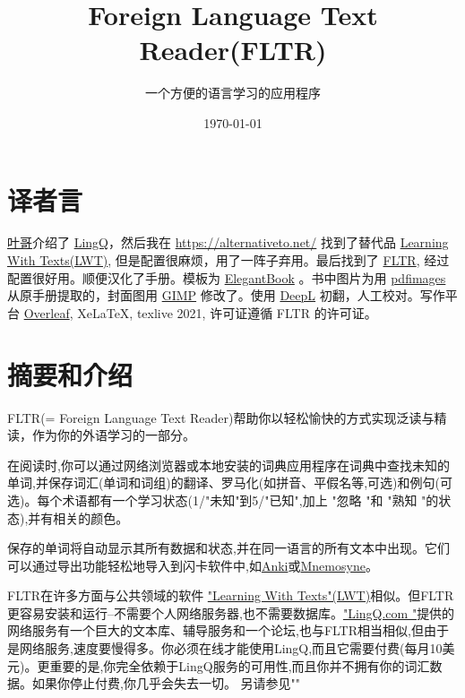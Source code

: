 \documentclass[cn,10pt,math=newtx,citestyle=gb7714-2015,bibstyle=gb7714-2015]{elegantbook}
\title{Foreign Language Text Reader(FLTR)}
\subtitle{一个方便的语言学习的应用程序}
\date{\today{}}
\begin{document}
\maketitle
\frontmatter

\tableofcontents

\mainmatter
\setlength{\parskip}{2em}

\chapter*{译者言}

\href{https://www.zhihu.com/people/L.M.Sherlock}{叶哥}介绍了 \href{http://www.lingq.com/}{LingQ}，然后我在 \url{https://alternativeto.net/} 找到了替代品  \href{http://lwt.sourceforge.net/}{Learning With Texts(LWT)}, 但是配置很麻烦，用了一阵子弃用。最后找到了 \href{https://sourceforge.net/projects/foreign-language-text-reader/}{FLTR}, 经过配置很好用。顺便汉化了手册。模板为 \href{https://github.com/ElegantLaTeX/ElegantBook}{ElegantBook} 。书中图片为用 \href{https://man.archlinux.org/man/pdfimages.1.en}{pdfimages} 从原手册提取的，封面图用 \href{https://www.gimp.org/}{GIMP} 修改了。使用 \href{https://www.deepl.com/translator/files}{DeepL} 初翻，人工校对。写作平台 \href{https://www.overleaf.com/}{Overleaf}, XeLaTeX, texlive 2021, 许可证遵循 FLTR 的许可证。

\chapter{摘要和介绍}

FLTR(= Foreign Language Text Reader)帮助你以轻松愉快的方式实现泛读与精读，作为你的外语学习的一部分。


在阅读时,你可以通过网络浏览器或本地安装的词典应用程序在词典中查找未知的单词,并保存词汇(单词和词组)的翻译、罗马化(如拼音、平假名等,可选)和例句(可选)。每个术语都有一个学习状态(1/"未知"到5/"已知",加上 "忽略 "和 "熟知 "的状态),并有相关的颜色。

保存的单词将自动显示其所有数据和状态,并在同一语言的所有文本中出现。它们可以通过导出功能轻松地导入到闪卡软件中,如\href{http://ankisrs.net/}{Anki}或\href{http://www.mnemosyne-proj.org/}{Mnemosyne}。


FLTR在许多方面与公共领域的软件 \href{http://lwt.sourceforge.net/}{"Learning With Texts"(LWT)}相似。但FLTR更容易安装和运行--不需要个人网络服务器,也不需要数据库。\href{http://www.lingq.com/}{"LingQ.com "}提供的网络服务有一个巨大的文本库、辅导服务和一个论坛,也与FLTR相当相似,但由于是网络服务,速度要慢得多。你必须在线才能使用LingQ,而且它需要付费(每月10美元)。更重要的是,你完全依赖于LingQ服务的可用性,而且你并不拥有你的词汇数据。如果你停止付费,你几乎会失去一切。
另请参见""
\end{document}
